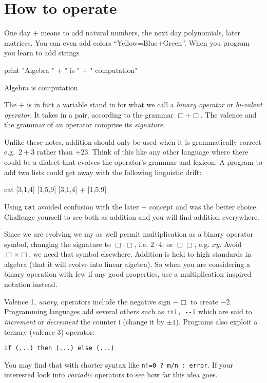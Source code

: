 \chapter{How to operate}

One day  $+$ means to add natural numbers, the next day 
polynomials, later matrices.  
You can even add colors ``Yellow=Blue+Green''. When you program 
you learn to add strings
\begin{center}
\begin{notebookin}
print "Algebra " + " is " + " computation"
\end{notebookin}
\begin{notebookout}
Algebra is computation
\end{notebookout}
\end{center}
The $+$ is in fact a variable stand in for what we call a \emph{binary operator}
or \emph{bi-valent operator}.  It takes in a pair, 
according to the grammar $\Box+\Box$.  The valence and the grammar 
of an operator comprise its  \emph{signature}.  

Unlike these notes, addition should only be used when it is grammatically 
correct e.g.\ $2+3$ rather than $+23$.  Think of this like any other language 
where there could be a dialect that evolves the operator's grammar and lexicon.  A program 
to add two lists could get away with the following linguistic drift:
\begin{center}
\begin{notebookin}
cat [3,1,4] [1,5,9]
[3,1,4] + [1,5,9]
\end{notebookin}
\begin{notebookout}[2]
[3,1,4,1,5,9]
[4,6,13]
\end{notebookout}
\end{center}
Using \texttt{cat} avoided confusion with the later $+$ 
concept and was the better choice.
Challenge yourself to see both as addition and you will 
find addition everywhere. 

Since we are evolving we my as well permit multiplication as a binary operator 
symbol, changing the signature to $\Box \cdot \Box$, i.e. $2\cdot 4$; or
$\Box\Box$, e.g. $xy$.   Avoid $\Box\times \Box$,
we need that symbol elsewhere. Addition is held to high standards in algebra
(that it will evolve into linear algebra).  So when you are considering a
binary operation with few if any good properties, use a
multiplication inspired notation instead.   


Valence 1, \emph{unary}, operators include the negative sign $-\Box$ to create 
$-2$.  Programming languages add several others 
such as \lstinline{++i, --i} which are said to \emph{increment} 
or \emph{decrement} the counter i (change it by $\pm 1$).
Programs also exploit a ternary (valence 3) operator:
\begin{center}
    \lstinline[language=Sava]{if (...) then (...) else (...)}
\end{center}
You may find that with shorter syntax like 
\lstinline{n!=0 ? m/n : error}.
If your interested look into \emph{variadic} operators to see how 
far this idea goes.

